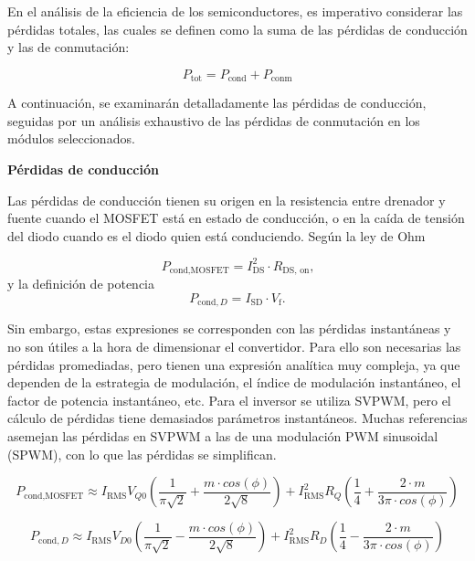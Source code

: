 En el análisis de la eficiencia de los semiconductores, es imperativo considerar las pérdidas totales, las cuales se definen como la suma de las pérdidas de conducción y las de conmutación:

\begin{equation}
	P_{\text{tot}} = P_{\text{cond}} + P_{\text{conm}}
\end{equation}

A continuación, se examinarán detalladamente las pérdidas de conducción, seguidas por un análisis exhaustivo de las pérdidas de conmutación en los módulos seleccionados.


\textbf{Pérdidas de conducción}

Las pérdidas de conducción tienen su origen en la resistencia entre drenador y fuente cuando el MOSFET está en estado de conducción, o en la caída de tensión del diodo cuando es el diodo quien está conduciendo. Según la ley de Ohm 

\begin{equation}
P_{\text{cond,MOSFET}}= I_{\text{DS}}^2\cdot R_{\text{DS, on}}\text{,}
\end{equation}
y la definición de potencia
\begin{equation}
P_{\text{cond},D} = I_{\text{SD}}\cdot V_\text{f}\text{.}
\end{equation}

Sin embargo, estas expresiones se corresponden con las pérdidas instantáneas y no son útiles a la hora de dimensionar el convertidor. Para ello son necesarias las pérdidas promediadas, pero tienen una expresión analítica muy compleja, ya que dependen de la estrategia de modulación, el índice de modulación instantáneo, el factor de potencia instantáneo, etc. Para el inversor se utiliza SVPWM, pero el cálculo de pérdidas tiene demasiados parámetros instantáneos. Muchas referencias asemejan las pérdidas en SVPWM a las de una modulación PWM sinusoidal (SPWM), con lo que las pérdidas se simplifican.

\begin{equation}
P_{\text{cond,MOSFET}} \approx I_{\text{RMS}} V_{Q0} \left(\frac{1}{\pi\sqrt{2}} + \frac{m\cdot cos(\phi)}{2\sqrt{8}}\right) + I_{\text{RMS}}^2 R_Q \left(\frac{1}{4} + \frac{2\cdot m}{3\pi\cdot cos(\phi)}\right)
\end{equation}

\begin{equation}
P_{\text{cond},D} \approx I_{\text{RMS}} V_{D0} \left(\frac{1}{\pi\sqrt{2}} - \frac{m\cdot cos(\phi)}{2\sqrt{8}}\right) + I_{\text{RMS}}^2 R_D \left(\frac{1}{4} - \frac{2\cdot m}{3\pi\cdot cos(\phi)}\right)
\end{equation}

